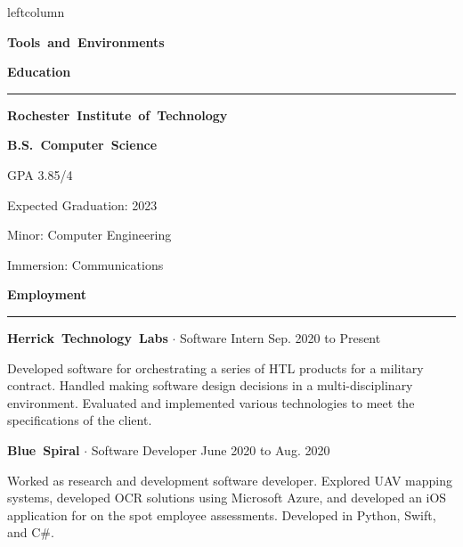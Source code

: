 \documentclass{article}
\newcommand{\rSection}[1] {
  \textcolor{header-blue} {
    \textbf{{\fontsize{0.5cm}{0.45cm}\selectfont \hbox{#1}}} \\
    \rule{0.30\textwidth}{0.1cm}
  }
}
\newcommand{\rSubSection}[1] {
  \textbf{{\fontsize{0.4cm}{0.45cm}\selectfont \hbox{#1}}}
}
\newcommand{\rSubSubSection}[1] {
  \textbf{{\fontsize{0.35cm}{0.45cm}\selectfont \hbox{#1}}}
}
\newcommand\level[2]{%
  \tikz{%
    \ifx#20
    \else
      \foreach \i in {1,...,#2} {
        \filldraw[black!20] (\i ex,0) circle (0.4ex);
      };
    \fi
    \ifx#10
    \else
      \foreach \i in {1,...,#1} {
        \filldraw[black] (\i ex,0) circle (0.4ex);
      };
    \fi
  }
}
\begin{document}
\begin{dynamiccontents*}{leftcolumn}
  \rSubSection{Tools and Environments} \par \bigskip


\end{dynamiccontents*}

\rSection{Education} \par \bigskip
\rSubSubSection{Rochester Institute of Technology} \par
\rSubSubSection{B.S. Computer Science} \par
GPA 3.85/4 \par
Expected Graduation: 2023 \par
Minor: Computer Engineering \par
Immersion: Communications \par \bigskip


\rSection{Employment} \par

\rSubSubSection{Herrick Technology Labs} $ \cdot $ Software Intern \hfill Sep. 2020 to Present \par
Developed software for orchestrating a series of HTL products for a military contract. Handled making
software design decisions in a multi-disciplinary environment. Evaluated and implemented various technologies
to meet the specifications of the client. \par \bigskip

\rSubSubSection{Blue Spiral} $ \cdot $ Software Developer \hfill June 2020 to Aug. 2020 \par
Worked as research and development software developer. Explored UAV mapping systems, developed OCR solutions
using Microsoft Azure, and developed an iOS application for on the spot employee assessments. Developed in
Python, Swift, and C\#. \par \bigskip
\end{document}
